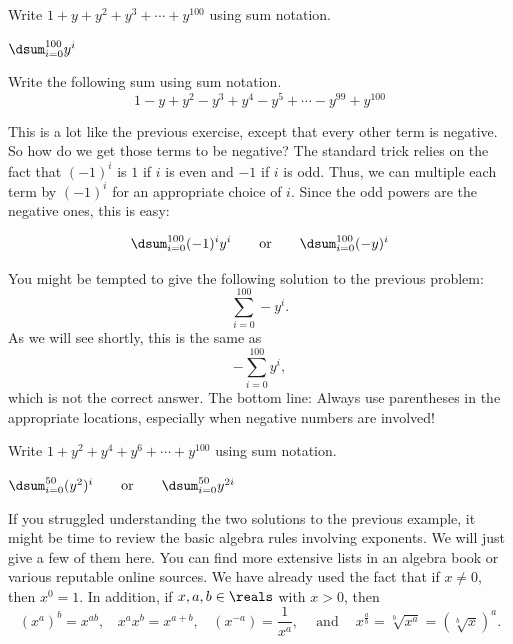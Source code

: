 \begin{exer}
Write $1 + y + y^2 + y^3 + \cdots + y^{100}$ using sum notation.

\vspace*{.5in}
\begin{answer}
$\dsum_{i=0}^{100} y^i$
\end{answer}
\end{exer}

\begin{exa}
Write the following sum using sum notation.
$$1 - y + y^2 - y^3 + y^4 - y^5 +  \cdots - y^{99}+ y^{100}$$
\begin{sol}
This is a lot like the previous exercise, except that every other term is negative.
So how do we get those terms to be negative?  The standard trick relies on the fact that
$(-1)^i$ is $1$ if $i$ is even and $-1$ if $i$ is odd.  Thus, we can multiple each term by
$(-1)^i$ for an appropriate choice of $i$.  Since the odd powers are the negative ones, this
is easy:

$$\dsum_{i=0}^{100} (-1)^iy^i \ \ \ \ \ \mbox{ or } \ \ \ \ \  \dsum_{i=0}^{100} (-y)^i$$
\end{sol}
\end{exa}

\begin{rem}
You might be tempted to give the following solution to the previous problem:
$$\sum_{i=0}^{100} -y^i.$$
As we will see shortly, this is the same as
$$-\sum_{i=0}^{100} y^i,$$
which is not the correct answer.
The bottom line: Always use parentheses in the appropriate locations, especially when negative numbers are involved!
\end{rem}

\begin{exer}
Write $1 + y^2 + y^4 + y^6 + \cdots + y^{100}$ using sum notation.

\vspace*{.5in}
\begin{answer}
$\dsum_{i=0}^{50} (y^2)^i \ \ \ \ \ \mbox{ or } \ \ \ \ \ \dsum_{i=0}^{50} y^{2i}$
\end{answer}
\end{exer}

\begin{rem}
If you struggled understanding the two solutions to the previous example, it might be time to
review the basic algebra rules involving exponents.  We will just give a few of them here.
You can find more extensive lists in an algebra book or various reputable online sources.
We have already used the fact that if $x\neq 0$, then $x^0=1$.
In addition, if $x,a,b\in \reals$ with $x>0$, then 
$$
(x^a)^b=x^{ab}, \ \ \ \  
x^ax^b=x^{a+b}, \ \ \ \ 
(x^{-a})=\frac{1}{x^a}, \ \ \ \ \mbox{ and } \ \ \ \ 
x^{\frac{a}{b}}=\sqrt[b]{x^a}=\left(\sqrt[b]{x}\right)^a.$$
\end{rem}

